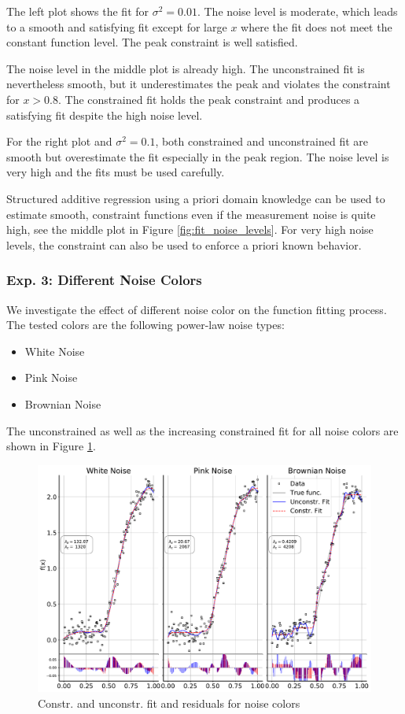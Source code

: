 \documentclass[10pt,a4paper]{article}
\begin{document}
The left plot shows the fit for $\sigma^2 = 0.01$. The noise level is moderate, which leads to a smooth and satisfying fit except for large $x$ where the fit does not meet the constant function level. The peak constraint is well satisfied. 

The noise level in the middle plot is already high. The unconstrained fit is nevertheless smooth, but it underestimates the peak and violates the constraint for $x > 0.8$. The constrained fit holds the peak constraint and produces a satisfying fit despite the high noise level.

For the right plot and $\sigma^2=0.1$, both constrained and unconstrained fit are smooth but overestimate the fit especially in the peak region. The noise level is very high and the fits must be used carefully. 

Structured additive regression using a priori domain knowledge can be used to estimate smooth, constraint functions even if the measurement noise is quite high, see the middle plot in Figure \ref{fig:fit_noise_levels}. For very high noise levels, the constraint can also be used to enforce a priori known behavior.  

\subsubsection{Exp. 3: Different Noise Colors}

We investigate the effect of different noise color on the function fitting process. The tested colors are the following power-law noise types:

\begin{itemize}
	\item  White Noise
	\item Pink Noise
	\item Brownian Noise
\end{itemize}

The unconstrained as well as the increasing constrained fit for all noise colors are shown in Figure \ref{fig:fit_noise_colors}.

\begin{figure}[H]
	\centering
	\includegraphics[width=\columnwidth]{../thesisplots/exp_noise_colors.pdf}
	\caption{Constr. and unconstr. fit and residuals for noise colors}
	\label{fig:fit_noise_colors}
\end{figure}
\end{document}

